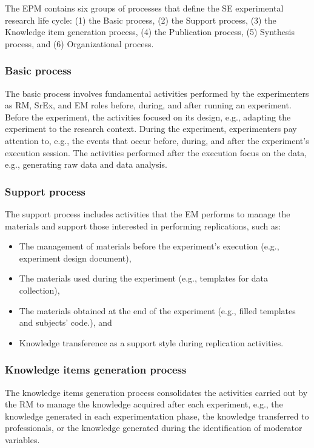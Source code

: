 The EPM contains six groups of processes that define the SE experimental research life cycle: (1) the Basic process, (2) the Support process, (3) the Knowledge item generation process, (4) the Publication process, (5) Synthesis process, and (6) Organizational process. 

\subsubsection{Basic process}
The basic process involves fundamental activities performed by the experimenters as RM, SrEx, and EM roles before, during, and after running an experiment. Before the experiment, the activities focused on its design, e.g., adapting the experiment to the research context. During the experiment, experimenters pay attention to, e.g., the events that occur before, during, and after the experiment's execution session. The activities performed after the execution focus on the data, e.g., generating raw data and data analysis.

\subsubsection{Support process}
The support process includes activities that the EM performs to manage the materials and support those interested in performing replications, such as:

\begin{itemize}
	\item The management of materials before the experiment's execution (e.g., experiment design document), 
	\item The materials used during the experiment (e.g., templates for data collection), 
	\item The materials obtained at the end of the experiment (e.g., filled templates and subjects' code.), and
	\item Knowledge transference as a support style during replication activities.
\end{itemize}

\subsubsection{Knowledge items generation process}
The knowledge items generation process consolidates the activities carried out by the RM to manage the knowledge acquired after each experiment, e.g., the knowledge generated in each experimentation phase, the knowledge transferred to professionals, or the knowledge generated during the identification of moderator variables.
   
